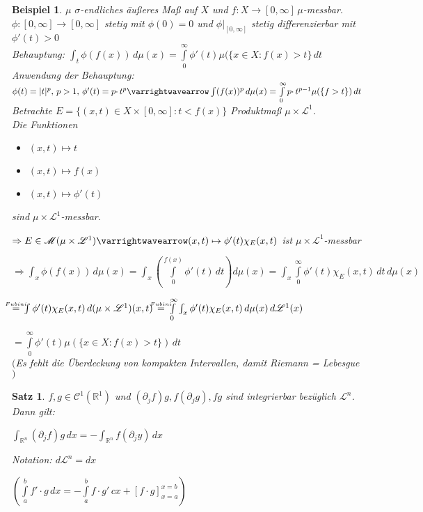 \documentclass[11pt]{memoir}
\theoremstyle{changebreak}
\newtheorem{Beispiel}{Beispiel}[chapter]
\newtheorem{Satz}{Satz}[chapter]
\newcommand\overequal[1]{\mathrel{\overset{\makebox[0pt]{\mbox{\normalfont\tiny\sffamily $ #1 $}}}{=}}}
\begin{document}


\begin{Beispiel}
$\mu$ $\sigma$-endliches äußeres Maß auf $X$ und $f: X \rightarrow [0, \infty]\, \mu$-messbar. $\phi: [0, \infty] \rightarrow [0, \infty]$ stetig mit $\phi(0) = 0$ und $\phi\lvert_{[0, \infty]}$ stetig differenzierbar mit $\phi'(t) >0$ \\
\emph{Behauptung}:
$\int_t \phi(f(x)) \, d\mu(x) = \int\limits_0^\infty \phi'(t)\mu(\{x \in X: f(x) >t\} \, dt$\\
\emph{Anwendung der Behauptung}:  \\
$\phi(t) = |t|^p, \, p>1, \, \phi'(t) = p \cdotp t^p \varrightwavearrow \int(f(x))^p \, d\mu(x) = \int\limits_0^\infty p\cdotp t^{p-1} \mu(\{f > t\}) \, dt$ \\
Betrachte $E = \{(x, t) \in X \times [0, \infty]: t < f(x)\}$ Produktmaß $\mu \times \mathscr L^1$. \\
Die Funktionen
\begin{itemize}
	\item $(x, t) \mapsto t$
	\item $(x, t) \mapsto f(x)$
	\item $(x, t) \mapsto \phi'(t)$
\end{itemize}
sind $\mu \times \mathscr L^1$-messbar. \\
\par
$\Rightarrow E \in \mathscr M(\mu \times \mathscr L^1) \varrightwavearrow (x, t) \mapsto \phi'(t) \chi_E(x, t)$ ist $\mu \times \mathscr L^1$-messbar \\
\par
$\Rightarrow \int_x \phi(f(x)) \, d\mu(x) = \int_x \left( \int\limits_0^{f(x)}\phi'(t)\, dt\right)d\mu(x) = \int_x\int\limits_0^\infty \phi'(t) \chi_E(x, t)\, dt \,d\mu(x)$
\par
$\overequal{Fubini}\, \int \phi'(t) \chi_E(x, t) \,d(\mu \times \mathscr L^1)(x, t) \,\overequal{Fubini} \,\int\limits_0^\infty \int_x \phi'(t)\chi_E(x, t) \,d\mu(x) \,d\mathscr L^1(x)$
\par
$ = \int\limits_0^\infty \phi'(t) \mu(\{x \in X: f(x) >t\})\, dt$ \\
$($Es fehlt die Überdeckung von kompakten Intervallen, damit Riemann = Lebesgue$)$
\end{Beispiel}

\begin{Satz}
$f, g\in \mathscr C^1(\mathbb R^1)$ und $(\partial_j f)g, f(\partial_j g), fg$ sind integrierbar bezüglich $\mathscr L^n$. Dann gilt:
\begin{center}
	$\int_{\mathbb R^n} (\partial_j f)g \, dx = - \int_{\mathbb R^n} f(\partial_j y) \, dx$
	\par\bigskip
	\emph{Notation}: $d\mathscr L^n = dx$
	\par\bigskip
	$\left(\int\limits_a^b f' \cdotp g \,dx = -\int\limits_a^b f\cdotp g' \, cx + [f\cdotp g]_{x=a}^{x=b} \right)$
\end{center}
\end{Satz}
\end{document}
